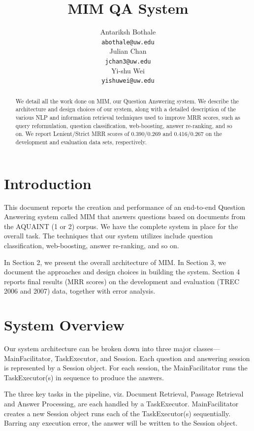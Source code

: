 \documentclass[11pt]{article}
\title{MIM QA System}
\author{Antariksh Bothale \\
  {\tt abothale@uw.edu} \\\And
  Julian Chan\\
  {\tt jchan3@uw.edu} \\\And
  Yi-shu Wei\\
  {\tt yishuwei@uw.edu}}
\date{}
\begin{document}
\maketitle
\begin{abstract}
We detail all the work done on MIM, our Question Answering system. We describe the architecture and design choices of our system, along with a detailed description of the various NLP and information retrieval techniques used to improve MRR scores, such as query reformulation, question classification, web-boosting, answer re-ranking, and so on. We report Lenient/Strict MRR scores of 0.390/0.269 and 0.416/0.267 on the development and evaluation data sets, respectively.


\end{abstract}

\section{Introduction}
This document reports the creation and performance of an end-to-end Question Answering system called MIM that answers questions based on documents from the AQUAINT (1 or 2) corpus. We have the complete system in place for the overall task. The techniques that our system utilizes include question classification, web-boosting, answer re-ranking, and so on.

In Section 2, we present the overall architecture of MIM. In Section 3, we document the approaches and design choices in building the system. Section 4 reports final results (MRR scores) on the development and evaluation (TREC 2006 and 2007) data, together with error analysis.

\section{System Overview}

Our system architecture can be broken down into three major classes---MainFacilitator, TaskExecutor, and Session. Each question and answering session is represented by a Session object. For each session, the MainFacilitator runs the TaskExecutor(s) in sequence to produce the answers. 

The three key tasks in the pipeline, viz. Document Retrieval, Passage Retrieval and Answer Processing, are each handled by a TaskExecutor. MainFacilitator creates a new Session object runs each of the TaskExecutor(s) sequentially. Barring any execution error, the answer will be written to the Session object. 
\end{document}
